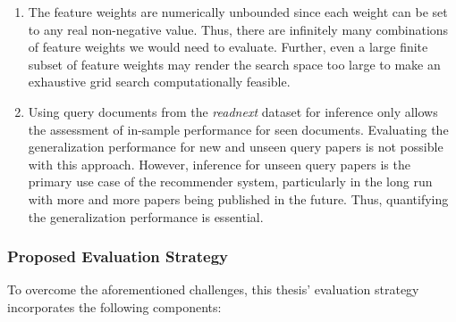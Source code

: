 \begin{enumerate}
    \item The feature weights are numerically unbounded since each weight can be set to any real non-negative value. Thus, there are infinitely many combinations of feature weights we would need to evaluate.
          Further, even a large finite subset of feature weights may render the search space too large to make an exhaustive grid search computationally feasible.
    \item Using query documents from the \emph{readnext} dataset for inference only allows the assessment of in-sample performance for seen documents.
          Evaluating the generalization performance for new and unseen query papers is not possible with this approach.
          However, inference for unseen query papers is the primary use case of the recommender system, particularly in the long run with more and more papers being published in the future.
          Thus, quantifying the generalization performance is essential.
\end{enumerate}

\subsubsection*{Proposed Evaluation Strategy}

To overcome the aforementioned challenges, this thesis' evaluation strategy incorporates the following components:

